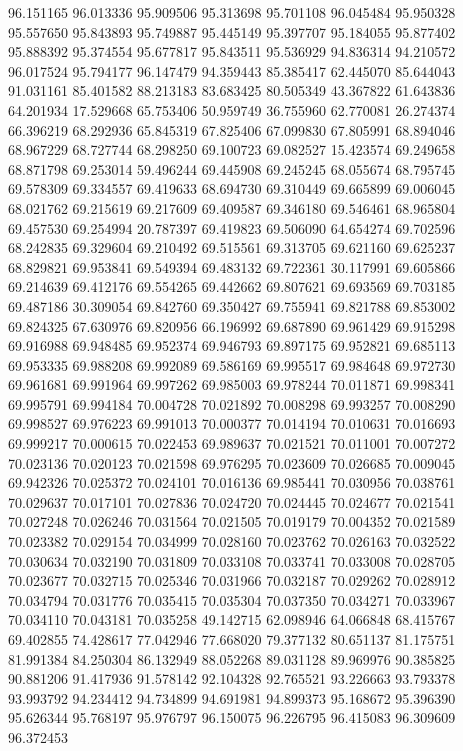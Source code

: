 96.151165
96.013336
95.909506
95.313698
95.701108
96.045484
95.950328
95.557650
95.843893
95.749887
95.445149
95.397707
95.184055
95.877402
95.888392
95.374554
95.677817
95.843511
95.536929
94.836314
94.210572
96.017524
95.794177
96.147479
94.359443
85.385417
62.445070
85.644043
91.031161
85.401582
88.213183
83.683425
80.505349
43.367822
61.643836
64.201934
17.529668
65.753406
50.959749
36.755960
62.770081
26.274374
66.396219
68.292936
65.845319
67.825406
67.099830
67.805991
68.894046
68.967229
68.727744
68.298250
69.100723
69.082527
15.423574
69.249658
68.871798
69.253014
59.496244
69.445908
69.245245
68.055674
68.795745
69.578309
69.334557
69.419633
68.694730
69.310449
69.665899
69.006045
68.021762
69.215619
69.217609
69.409587
69.346180
69.546461
68.965804
69.457530
69.254994
20.787397
69.419823
69.506090
64.654274
69.702596
68.242835
69.329604
69.210492
69.515561
69.313705
69.621160
69.625237
68.829821
69.953841
69.549394
69.483132
69.722361
30.117991
69.605866
69.214639
69.412176
69.554265
69.442662
69.807621
69.693569
69.703185
69.487186
30.309054
69.842760
69.350427
69.755941
69.821788
69.853002
69.824325
67.630976
69.820956
66.196992
69.687890
69.961429
69.915298
69.916988
69.948485
69.952374
69.946793
69.897175
69.952821
69.685113
69.953335
69.988208
69.992089
69.586169
69.995517
69.984648
69.972730
69.961681
69.991964
69.997262
69.985003
69.978244
70.011871
69.998341
69.995791
69.994184
70.004728
70.021892
70.008298
69.993257
70.008290
69.998527
69.976223
69.991013
70.000377
70.014194
70.010631
70.016693
69.999217
70.000615
70.022453
69.989637
70.021521
70.011001
70.007272
70.023136
70.020123
70.021598
69.976295
70.023609
70.026685
70.009045
69.942326
70.025372
70.024101
70.016136
69.985441
70.030956
70.038761
70.029637
70.017101
70.027836
70.024720
70.024445
70.024677
70.021541
70.027248
70.026246
70.031564
70.021505
70.019179
70.004352
70.021589
70.023382
70.029154
70.034999
70.028160
70.023762
70.026163
70.032522
70.030634
70.032190
70.031809
70.033108
70.033741
70.033008
70.028705
70.023677
70.032715
70.025346
70.031966
70.032187
70.029262
70.028912
70.034794
70.031776
70.035415
70.035304
70.037350
70.034271
70.033967
70.034110
70.043181
70.035258
49.142715
62.098946
64.066848
68.415767
69.402855
74.428617
77.042946
77.668020
79.377132
80.651137
81.175751
81.991384
84.250304
86.132949
88.052268
89.031128
89.969976
90.385825
90.881206
91.417936
91.578142
92.104328
92.765521
93.226663
93.793378
93.993792
94.234412
94.734899
94.691981
94.899373
95.168672
95.396390
95.626344
95.768197
95.976797
96.150075
96.226795
96.415083
96.309609
96.372453
